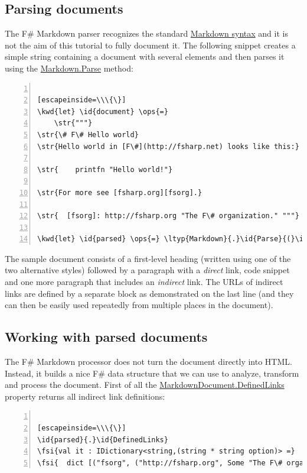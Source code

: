 \documentclass{article}
\newcommand{\id}[1]{\textcolor{black}{#1}}
\newcommand{\kwd}[1]{\textcolor{navy}{#1}}
\newcommand{\ops}[1]{\textcolor{purple}{#1}}
\newcommand{\str}[1]{\textcolor{olive}{#1}}
\newcommand{\fsi}[1]{\textcolor{outputcolor}{#1}}
\begin{document}
\subsection*{Parsing documents}



The F\# Markdown parser recognizes the standard \href{http://daringfireball.net/projects/markdown/}{Markdown syntax}
and it is not the aim of this tutorial to fully document it.
The following snippet creates a simple string containing a document
with several elements and then parses it using the \href{https://fsprojects.github.io/FSharp.Formatting/reference/fsharp-formatting-markdown-markdown.html\#Parse}{Markdown.Parse} method:
\begin{lstlisting}[numbers=left]

[escapeinside=\\\{\}]
\kwd{let} \id{document} \ops{=}
    \str{"""}
\str{\# F\# Hello world}
\str{Hello world in [F\#](http://fsharp.net) looks like this:}

\str{    printfn "Hello world!"}

\str{For more see [fsharp.org][fsorg].}

\str{  [fsorg]: http://fsharp.org "The F\# organization." """}

\kwd{let} \id{parsed} \ops{=} \ltyp{Markdown}{.}\id{Parse}{(}\id{document}{)}

\end{lstlisting}



The sample document consists of a first-level heading (written using
one of the two alternative styles) followed by a paragraph with a
\emph{direct} link, code snippet and one more paragraph that includes an
\emph{indirect} link. The URLs of indirect links are defined by a separate
block as demonstrated on the last line (and they can then be easily used repeatedly
from multiple places in the document).
\subsection*{Working with parsed documents}



The F\# Markdown processor does not turn the document directly into HTML.
Instead, it builds a nice F\# data structure that we can use to analyze,
transform and process the document. First of all the \href{https://fsprojects.github.io/FSharp.Formatting/reference/fsharp-formatting-markdown-markdowndocument.html\#DefinedLinks}{MarkdownDocument.DefinedLinks} property
returns all indirect link definitions:
\begin{lstlisting}[numbers=left]

[escapeinside=\\\{\}]
\id{parsed}{.}\id{DefinedLinks}
\fsi{val it : IDictionary<string,(string * string option)> =}
\fsi{  dict [("fsorg", ("http://fsharp.org", Some "The F\# organization."))]}

\end{lstlisting}
\end{document}
